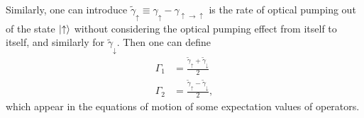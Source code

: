 Similarly, one can introduce $\tilde{\gamma}_\uparrow  \equiv \gamma_\uparrow - \gamma_{\uparrow \rightarrow \uparrow}$ is the rate of optical pumping out of the state $\lvert{\uparrow}\rangle$ without considering the optical pumping effect from itself to itself, and similarly for $\tilde{\gamma}_\downarrow$. Then one can define 
\begin{align}
\Gamma_1 &= \frac{\tilde{\gamma}_\uparrow + \tilde{\gamma}_\downarrow}{2}\\
\Gamma_2 &= \frac{\tilde{\gamma}_\uparrow - \tilde{\gamma}_\downarrow}{2},
\end{align}
which appear in the equations of motion of some expectation values of operators.


\begin{figure}
\begin{minipage}{.5\linewidth}
\centering
{}
\end{minipage}
\begin{minipage}{.5\linewidth}
\centering
{}

\end{minipage}
\end{figure}
